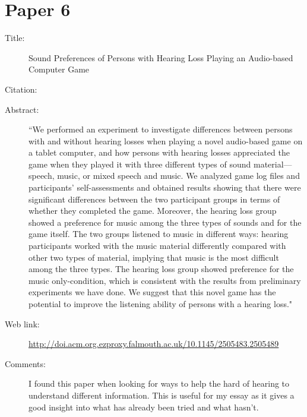 \documentclass{scrartcl}
\begin{document}
\section*{Paper 6}
\begin{description}
\item[Title:] Sound Preferences of Persons with Hearing Loss Playing an Audio-based Computer Game
\item[Citation:] \cite{Hiraga}
\item[Abstract:] ``We performed an experiment to investigate differences between persons with and without hearing losses when playing a novel audio-based game on a tablet computer, and how persons with hearing losses appreciated the game when they played it with three different types of sound material---speech, music, or mixed speech and music. We analyzed game log files and participants' self-assessments and obtained results showing that there were significant differences between the two participant groups in terms of whether they completed the game. Moreover, the hearing loss group showed a preference for music among the three types of sounds and for the game itself. The two groups listened to music in different ways: hearing participants worked with the music material differently compared with other two types of material, implying that music is the most difficult among the three types. The hearing loss group showed preference for the music only-condition, which is consistent with the results from preliminary experiments we have done. We suggest that this novel game has the potential to improve the listening ability of persons with a hearing loss."
\item[Web link:]  \url{http://doi.acm.org.ezproxy.falmouth.ac.uk/10.1145/2505483.2505489}
\item[Comments:] I found this paper when looking for ways to help the hard of hearing to understand different information. This is useful for my essay as it gives a good insight into what has already been tried and what hasn't.
\end{description}



\end{document}
